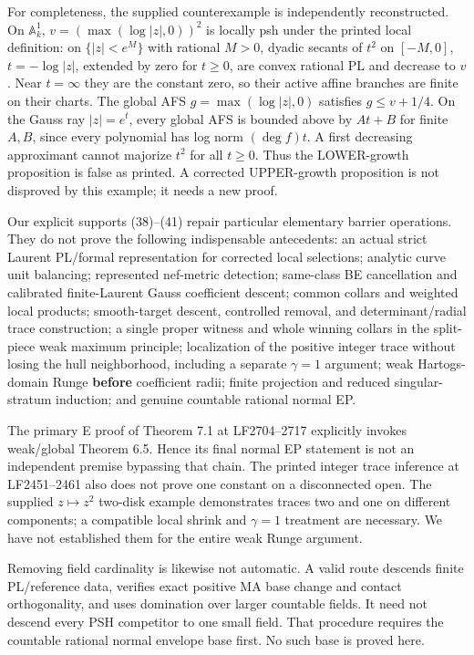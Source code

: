 \documentclass[
  10pt,
]{article}
\begin{document}
For completeness, the supplied counterexample is independently
reconstructed. On \(\mathbb A^1_k\), \(v=(\max(\log|z|,0))^2\) is
locally psh under the printed local definition: on \(\{|z|<e^M\}\) with
rational \(M>0\), dyadic secants of \(t^2\) on \([-M,0]\),
\(t=-\log|z|\), extended by zero for \(t\ge0\), are convex rational PL
and decrease to \(v\). Near \(t=\infty\) they are the constant zero, so
their active affine branches are finite on their charts. The global AFS
\(g=\max(\log|z|,0)\) satisfies \(g\le v+1/4\). On the Gauss ray
\(|z|=e^t\), every global AFS is bounded above by \(At+B\) for finite
\(A,B\), since every polynomial has log norm \((\deg f)t\). A first
decreasing approximant cannot majorize \(t^2\) for all \(t\ge0\). Thus
the LOWER-growth proposition is false as printed. A corrected
UPPER-growth proposition is not disproved by this example; it needs a
new proof.

Our explicit supports (38)--(41) repair particular elementary barrier
operations. They do not prove the following indispensable antecedents:
an actual strict Laurent PL/formal representation for corrected local
selections; analytic curve unit balancing; represented nef-metric
detection; same-class BE cancellation and calibrated finite-Laurent
Gauss coefficient descent; common collars and weighted local products;
smooth-target descent, controlled removal, and determinant/radial trace
construction; a single proper witness and whole winning collars in the
split-piece weak maximum principle; localization of the positive integer
trace without losing the hull neighborhood, including a separate
\(\gamma=1\) argument; weak Hartogs-domain Runge \textbf{before}
coefficient radii; finite projection and reduced singular-stratum
induction; and genuine countable rational normal EP.

The primary E proof of Theorem 7.1 at LF2704--2717 explicitly invokes
weak/global Theorem 6.5. Hence its final normal EP statement is not an
independent premise bypassing that chain. The printed integer trace
inference at LF2451--2461 also does not prove one constant on a
disconnected open. The supplied \(z\mapsto z^2\) two-disk example
demonstrates traces two and one on different components; a compatible
local shrink and \(\gamma=1\) treatment are necessary. We have not
established them for the entire weak Runge argument.

Removing field cardinality is likewise not automatic. A valid route
descends finite PL/reference data, verifies exact positive MA base
change and contact orthogonality, and uses domination over larger
countable fields. It need not descend every PSH competitor to one small
field. That procedure requires the countable rational normal envelope
base first. No such base is proved here.
\end{document}
